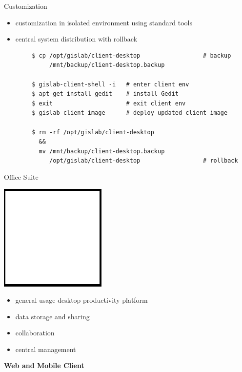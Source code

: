 \documentclass[12pt]{beamer}
\begin{document}
\begin{frame}[fragile]{Customization}
	\begin{itemize}
		\item customization in isolated environment using standard tools
		\item central system distribution with rollback
	\end{itemize}
	
	\lstset{language=sh}
	\begin{lstlisting}
		$ cp /opt/gislab/client-desktop                  # backup
		     /mnt/backup/client-desktop.backup
		
		$ gislab-client-shell -i   # enter client env
		$ apt-get install gedit    # install Gedit
		$ exit                     # exit client env
		$ gislab-client-image      # deploy updated client image
		
		$ rm -rf /opt/gislab/client-desktop
		  &&
		  mv /mnt/backup/client-desktop.backup
		     /opt/gislab/client-desktop                  # rollback
	\end{lstlisting}
\end{frame}

\begin{frame}{Office Suite}
	\begin{center}
		\includegraphics[keepaspectratio=true,height=0.5\textheight]{images/image.png}
	\end{center}
	\begin{itemize}
		\item general usage desktop productivity platform
		\item data storage and sharing
		\item collaboration
		\item central management
	\end{itemize}
\end{frame}


\begin{frame}
	\begin{center}
		\LARGE\textbf{Web and Mobile Client}	
	\end{center}
\end{frame}
\end{document}
